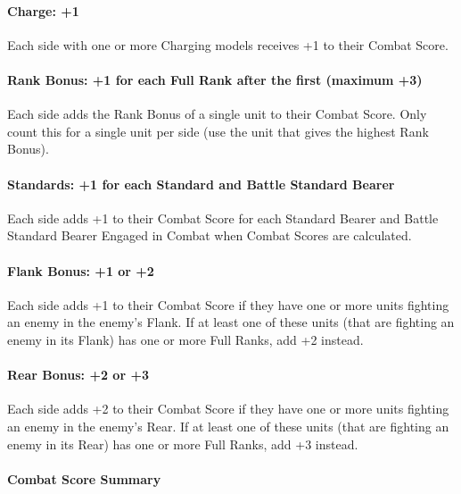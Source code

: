 \paragraph{Charge: +1}

Each side with one or more Charging models receives +1 to their Combat Score.

\paragraph{Rank Bonus: +1 for each Full Rank after the first (maximum +3)}

Each side adds the Rank Bonus of a single unit to their Combat Score. Only count this for a single unit per side (use the unit that gives the highest Rank Bonus).

\paragraph{Standards: +1 for each Standard and Battle Standard Bearer}

Each side adds +1 to their Combat Score for each Standard Bearer and Battle Standard Bearer Engaged in Combat when Combat Scores are calculated.

\paragraph{Flank Bonus: +1 or +2}

Each side adds +1 to their Combat Score if they have one or more units fighting an enemy in the enemy's Flank. If at least one of these units (that are fighting an enemy in its Flank) has one or more Full Ranks, add +2 instead.

\paragraph{Rear Bonus: +2 or +3}

Each side adds +2 to their Combat Score if they have one or more units fighting an enemy in the enemy's Rear. If at least one of these units (that are fighting an enemy in its Rear) has one or more Full Ranks, add +3 instead.

\paragraph{Combat Score Summary}


